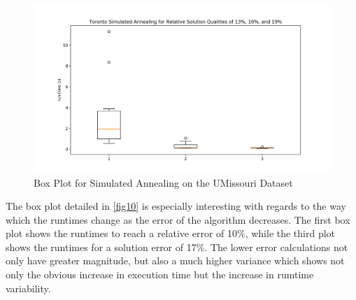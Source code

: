 \documentclass[format=sigconf]{acmart}
\begin{document}
\begin{figure}[htbp]
    \centerline{\includegraphics[scale=.5]{graphs/UMissouri_LS2_Box.png}}
    \caption{Box Plot for Simulated Annealing on the UMissouri Dataset}
    \label{fig12}
\end{figure}
The box plot detailed in \ref{fig10} is especially interesting with regards to the way which the runtimes
change as the error of the algorithm decreases. The first box plot shows the runtimes to reach a relative error of 10\%, while the third plot 
shows the runtimes for a solution error of 17\%. The lower error calculations not only have greater magnitude, but also a much higher variance 
which shows not only the obvious increase in execution time but the increase in rumtime variability.

 \clearpage
\end{document}
